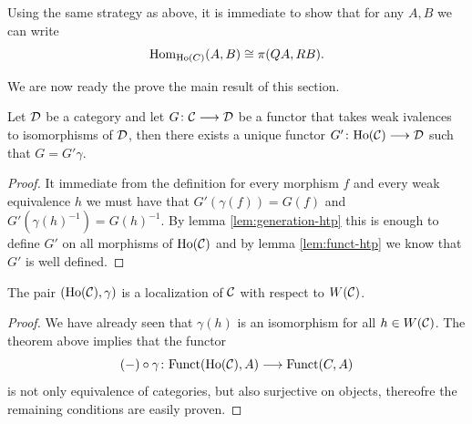 \begin{remark}
	Using the same strategy as above, it is immediate to show that for any $A,B$ we can write \[\mathrm{Hom}_{\mathrm{Ho}(C)}(A,B) \cong \pi(QA, RB). \]
\end{remark}

We are now ready the prove the main result of this section.

\begin{theorem}
	Let $\mathcal{D}$ be a category and let $G\colon \mathcal{C} \longrightarrow \mathcal{D}$ be a functor that takes weak ivalences to isomorphisms of $\mathcal{D}$, then there exists a unique functor $G' \colon \mathrm{Ho}(\mathcal{C}) \longrightarrow \mathcal{D}$ such that $G = G'\gamma$.
\end{theorem}


\begin{proof}
	 It immediate from the definition for every morphism $f$ and every weak equivalence $h$ we must have that $G'(\gamma(f)) = G(f)$ and $G'(\gamma(h)^{-1}) = G(h)^{-1}$. By lemma \ref{lem:generation-htp} this is enough to define $G'$ on all morphisms of $\mathrm{Ho}(\mathcal{C})$ and by lemma \ref{lem:funct-htp} we know that $G'$ is well defined. 
\end{proof}

\begin{corollary}
	The pair $(\mathrm{Ho}(\mathcal{C}), \gamma)$ is a localization of $\mathcal{C}$ with respect to $W(\mathcal{C})$.
\end{corollary}

\begin{proof}
	We have already seen that $\gamma(h)$ is an isomorphism for all $h \in W(\mathcal{C})$. The theorem above implies that the functor
	\[(-) \circ \gamma \colon \mathrm{Funct}(\mathrm{Ho}(\mathcal{C}), A) \longrightarrow \mathrm{Funct}(C,A)\]
	is not only equivalence of categories, but also surjective on objects, thereofre the remaining conditions are easily proven.
\end{proof}
